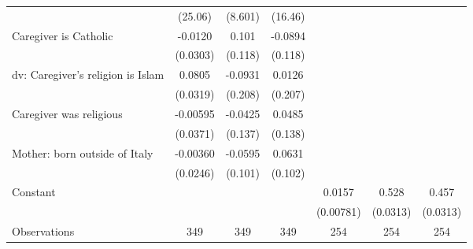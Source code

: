 {\begin{tabular}{l*{6}{c}}
                    &     (25.06)         &     (8.601)         &     (16.46)         &                     &                     &                     \\
\addlinespace
Caregiver is Catholic&     -0.0120         &       0.101         &     -0.0894         &                     &                     &                     \\
                    &    (0.0303)         &     (0.118)         &     (0.118)         &                     &                     &                     \\
\addlinespace
dv: Caregiver's religion is Islam&      0.0805\sym{*}  &     -0.0931         &      0.0126         &                     &                     &                     \\
                    &    (0.0319)         &     (0.208)         &     (0.207)         &                     &                     &                     \\
\addlinespace
Caregiver was religious&    -0.00595         &     -0.0425         &      0.0485         &                     &                     &                     \\
                    &    (0.0371)         &     (0.137)         &     (0.138)         &                     &                     &                     \\
\addlinespace
Mother: born outside of Italy&    -0.00360         &     -0.0595         &      0.0631         &                     &                     &                     \\
                    &    (0.0246)         &     (0.101)         &     (0.102)         &                     &                     &                     \\
\addlinespace
Constant            &                     &                     &                     &      0.0157\sym{*}  &       0.528\sym{***}&       0.457\sym{***}\\
                    &                     &                     &                     &   (0.00781)         &    (0.0313)         &    (0.0313)         \\
\midrule
Observations        &         349         &         349         &         349         &         254         &         254         &         254         \\
\bottomrule
\end{tabular}
}
